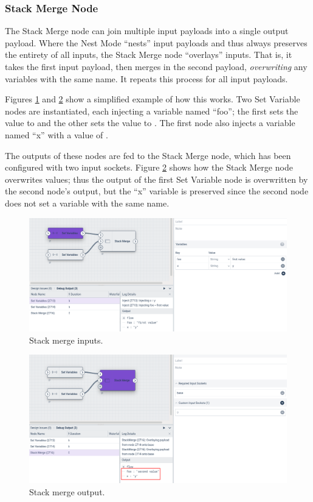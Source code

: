 \subsubsection{Stack Merge Node}
The Stack Merge node can join multiple input payloads into a single output payload. Where the Nest Mode ``nests'' input payloads and thus always preserves the entirety of all inputs, the Stack Merge node ``overlays'' inputs. That is, it takes the first input payload, then merges in the second payload, \emph{overwriting} any variables with the same name. It repeats this process for all input payloads.

Figures \ref{fig:stackmerge1} and \ref{fig:stackmerge2} show a simplified example of how this works. Two Set Variable nodes are instantiated, each injecting a variable named ``foo''; the first sets the value to  and the other sets the value to . The first node also injects a variable named ``x'' with a value of .

The outputs of these nodes are fed to the Stack Merge node, which has been configured with two input sockets. Figure \ref{fig:stackmerge2} shows how the Stack Merge node overwrites values; thus the  output of the first Set Variable node is overwritten by the second node's  output, but the ``x'' variable is preserved since the second node does not set a variable with the same name.

\begin{figure}
	\includegraphics[width=0.85\linewidth]{images/stackmerge1.png}
	\caption{Stack merge inputs.}
	\label{fig:stackmerge1}
\end{figure}

\begin{figure}
	\includegraphics[width=0.85\linewidth]{images/stackmerge2.png}
	\caption{Stack merge output.}
	\label{fig:stackmerge2}
\end{figure}

